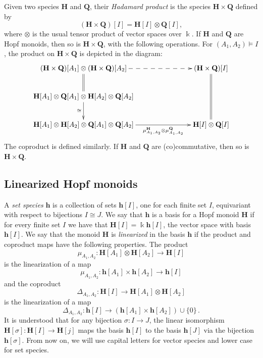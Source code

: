 \documentclass[10pt]{amsart}
\theoremstyle{definition}
\def\field{\Bbbk}
\newcommand{\bH}{\mathbf{H}}
\newcommand{\bh}{\mathbf{h}}
\begin{document}
Given two species $\bH$ and $\mathbf{Q}$, their \emph{Hadamard product} is the species $\bH\times\mathbf{Q}$ defined by
\[
(\bH\times\mathbf{Q})[I] = \bH[I]\otimes\mathbf{Q}[I],
\]
where $\otimes$ is the usual tensor product of vector spaces over $\field$.
If $\bH$ and $\mathbf{Q}$ are Hopf monoids, then so is $\bH\times\mathbf{Q}$, with the following operations. For $(A_1, A_2)\models I$, the product on $\bH\times\mathbf{Q}$ is depicted in the diagram:
\[
\xymatrix@C+12pt{
(\bH\times\mathbf{Q})[A_1]\otimes(\bH\times\mathbf{Q})[A_2] \ar@{=}[d] \ar@{-->}[rr] &&
 (\bH\times\mathbf{Q})[I] \ar@{=}[dd] \\
\bH[A_1]\otimes \mathbf{Q}[A_1]\otimes \bH[A_2]\otimes \mathbf{Q}[A_2]
\ar[d]_{\cong} && \\
\bH[A_1]\otimes \bH[A_2]\otimes \mathbf{Q}[A_1]\otimes \mathbf{Q}[A_2]
\ar[rr]_-{\mu_{A_1,A_2}^{\mathbf{H}}\otimes\mu_{A_1,A_2}^{\mathbf{Q}}} &&
\bH[I]\otimes\mathbf{Q}[I]
}
\]
The coproduct is defined similarly. If $\bH$ and $\mathbf{Q}$ are (co)commutative, then so is $\bH\times\mathbf{Q}$. 

\subsection{Linearized Hopf monoids}\label{ss:stronglin} A \emph{set species} $\bh$ is a collection of sets $\bh[I]$,
one for each finite set $I$, equivariant with respect to bijections $I\cong J$.
We say that $\bh$ is a basis for a Hopf monoid $\bH$ if for every finite set $I$ we have that $\bH[I]=\field \bh[I]$, the vector space with basis $\bh[I]$. We say that the monoid $\bH$ is \emph{linearized} in the basis $\bh$ if the product and coproduct maps have the following properties.
The product
\[
\mu_{A_1,A_2}: \bH[A_1] \otimes \bH[A_2] \to \bH[I] 
\]
is the linearization of a map
\begin{equation}\label{e:prod-lin}
\mu_{A_1,A_2}: \bh[A_1] \times \bh[A_2] \to \bh[I] 
\end{equation}
and the coproduct
\[
\Delta_{A_1,A_2}: \bH[I] \to \bH[A_1]\otimes\bH[A_2]
\]
is the linearization of a map
\begin{equation}\label{e:coprod-lin}
\Delta_{A_1,A_2}: \bh[I] \to (\bh[A_1]\times\bh[A_2])\cup\{0\}\,.
\end{equation}
It is understood that for any bijection $\sigma\colon I \to J$, the linear isomorphism $\bH[\sigma]\colon \bH[I]\to \bH[j]$ maps the basis $\bh[I]$ to the basis $\bh[J]$ via the bijection $\bh[\sigma]$.
From now on, we will use capital letters for vector species and lower case for set species.
\end{document}
